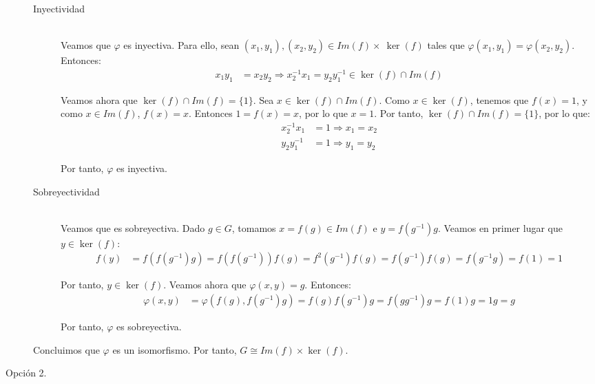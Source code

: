 \begin{ejercicio}
\begin{description}
\begin{description}
            \item [Inyectividad]~\\
            Veamos que $\varphi$ es inyectiva. Para ello, sean $(x_1,y_1),(x_2,y_2)\in Im(f)\times~\ker(f)$ tales que $\varphi(x_1,y_1)=\varphi(x_2,y_2)$. Entonces:
            \begin{align*}
                x_1y_1 &= x_2y_2 \Longrightarrow x_2^{-1}x_1=y_2y_1^{-1}\in \ker(f)\cap Im(f)
            \end{align*}

            Veamos ahora que $\ker(f)\cap Im(f)=\{1\}$. Sea $x\in \ker(f)\cap Im(f)$. Como $x\in \ker(f)$, tenemos que $f(x)=1$, y como $x\in Im(f)$, $f(x)=x$. Entonces $1=f(x)=x$, por lo que $x=1$. Por tanto, $\ker(f)\cap Im(f)=\{1\}$, por lo que:
            \begin{align*}
                x_2^{-1}x_1 &= 1\Longrightarrow x_1=x_2\\
                y_2y_1^{-1} &= 1\Longrightarrow y_1=y_2
            \end{align*}

            Por tanto, $\varphi$ es inyectiva.
            
            \item [Sobreyectividad]~\\
            Veamos que es sobreyectiva. Dado $g\in G$, tomamos $x=f(g)\in Im(f)$ e $y=f(g^{-1})g$. Veamos en primer lugar que $y\in \ker(f)$:
            \begin{align*}
                f(y) &= f(f(g^{-1})g) = f(f(g^{-1}))f(g) = f^2(g^{-1})f(g)
                = f(g^{-1})f(g) = f(g^{-1}g) = f(1) = 1
            \end{align*}

            Por tanto, $y\in \ker(f)$. Veamos ahora que $\varphi(x,y)=g$. Entonces:
            \begin{align*}
                \varphi(x,y) &= \varphi(f(g),f(g^{-1})g) = f(g)f(g^{-1})g = f(gg^{-1})g = f(1)g = 1g = g
            \end{align*}

            Por tanto, $\varphi$ es sobreyectiva.
        \end{description}

        Concluimos que $\varphi$ es un isomorfismo. Por tanto, $G\cong Im(f)\times \ker(f)$.

        \item[Opción 2.]~
        

\end{description}
\end{ejercicio}
